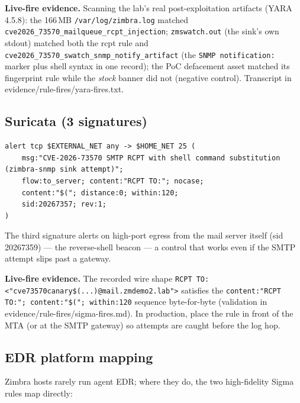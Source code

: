 \documentclass[journal]{IEEEtran}
\begin{document}
\textbf{Live-fire evidence.} Scanning the lab's real post-exploitation artifacts
(YARA 4.5.8): the 166\,MB \texttt{/var/log/zimbra.log} matched
\texttt{cve2026\_73570\_mailqueue\_rcpt\_injection};
\texttt{zmswatch.out} (the sink's own stdout) matched both the rcpt rule and
\texttt{cve2026\_73570\_swatch\_snmp\_notify\_artifact} (the
\texttt{SNMP notification:} marker plus shell syntax in one record); the PoC
defacement asset matched its fingerprint rule while the \emph{stock} banner
did not (negative control). Transcript in evidence/rule-fires/yara-fires.txt.

\subsection{Suricata (3 signatures)}

\begin{lstlisting}[style=shell,caption={Suricata: SMTP attempt on the wire (sids 20267357/20267358)}]
alert tcp $EXTERNAL_NET any -> $HOME_NET 25 (
    msg:"CVE-2026-73570 SMTP RCPT with shell command substitution (zimbra-snmp sink attempt)";
    flow:to_server; content:"RCPT TO:"; nocase;
    content:"$("; distance:0; within:120;
    sid:20267357; rev:1;
)
\end{lstlisting}

The third signature alerts on high-port egress from the mail server itself
(sid 20267359) — the reverse-shell beacon — a control that works even if the
SMTP attempt slips past a gateway.

\textbf{Live-fire evidence.} The recorded wire shape
\texttt{RCPT TO: <"cve73570canary\$(...)@mail.zmdemo2.lab">} satisfies the
\texttt{content:"RCPT TO:"; content:"\$("; within:120} sequence
byte-for-byte (validation in evidence/rule-fires/sigma-fires.md). In
production, place the rule in front of the MTA (or at the SMTP gateway) so
attempts are caught before the log hop.

\subsection{EDR platform mapping}

Zimbra hosts rarely run agent EDR; where they do, the two high-fidelity
Sigma rules map directly:
\end{document}
